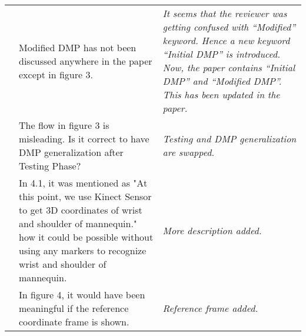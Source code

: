 \documentclass{article}
\begin{document}
\begin{table}
\begin{tabular}{ |c|p{9cm}|p{5cm}| }
		                   & Modified DMP has not been discussed anywhere in the paper except in figure 3.                                                                                                                                                                                                                                                                                                                                              & \textit{It seems that the reviewer was getting confused with ``Modified'' keyword. Hence a new keyword ``Initial DMP'' is introduced. Now, the paper contains ``Initial DMP'' and ``Modified DMP''. This has been updated in the paper.}                                                                                                            \\ \cline{2-3}
		                   & The flow in figure 3 is misleading. Is it correct to have DMP generalization after Testing Phase?                                                                                                                                                                                                                                                                                                                          & \textit{Testing and DMP generalization are swapped.}                                                                                        \\ \cline{2-3}
		                   & In 4.1, it was mentioned as "At this point, we use Kinect Sensor to get 3D coordinates of wrist and shoulder of mannequin." how it could be possible without using any markers to recognize wrist and shoulder of mannequin.                                                                                                                                                                                               & \textit{More description added.}                                                                                                            \\ \cline{2-3}
		                   & In figure 4, it would have been meaningful if the reference coordinate frame is shown.                                                                                                                                                                                                                                                                                                                                     & \textit{Reference frame added.}                                                                                                             \\ \hline

\end{tabular}
\end{table}
\end{document}

